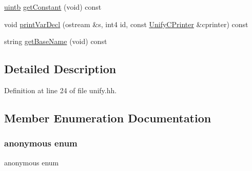 \begin{DoxyCompactItemize}
\item 
\mbox{\hyperlink{types_8h_a2db313c5d32a12b01d26ac9b3bca178f}{uintb}} \mbox{\hyperlink{class_unify_datatype_a021723137b85219d7638dc4a4681ad7e}{get\+Constant}} (void) const
\item 
void \mbox{\hyperlink{class_unify_datatype_a8a0f80adcffc25adfbcb503774c42cbf}{print\+Var\+Decl}} (ostream \&s, int4 id, const \mbox{\hyperlink{class_unify_c_printer}{Unify\+C\+Printer}} \&cprinter) const
\item 
string \mbox{\hyperlink{class_unify_datatype_a692348439ddb73f8c826bf687ac8aa9a}{get\+Base\+Name}} (void) const
\end{DoxyCompactItemize}


\subsection{Detailed Description}


Definition at line 24 of file unify.\+hh.



\subsection{Member Enumeration Documentation}
\mbox{\label{class_unify_datatype_afa325e5ad483cbc4dd821b426d197d87}} 
\subsubsection{\texorpdfstring{anonymous enum}{anonymous enum}}
{\footnotesize\ttfamily anonymous enum}

